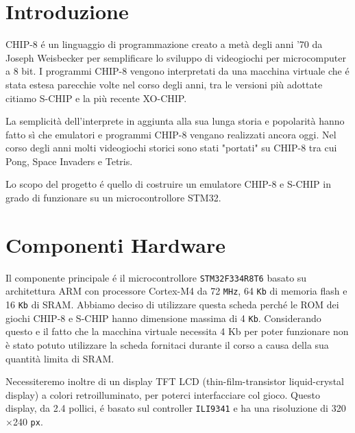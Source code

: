 \documentclass[a4paper]{article}
\begin{document}
\setlength{\parindent}{0pt}
\setlength{\parskip}{0.8em}
\linespread{1.5}

\section{Introduzione}

CHIP-8 é un linguaggio di programmazione creato a metà degli anni '70 da Joseph Weisbecker per semplificare lo sviluppo di videogiochi per microcomputer a 8 bit. I programmi CHIP-8 vengono interpretati da una macchina virtuale che é stata estesa parecchie volte nel corso degli anni, tra le versioni più adottate citiamo S-CHIP e la più recente XO-CHIP.

La semplicità dell'interprete in aggiunta alla sua lunga storia e popolarità hanno fatto sì che emulatori e programmi CHIP-8 vengano realizzati ancora oggi. Nel corso degli anni molti videogiochi storici sono stati "portati" su CHIP-8 tra cui Pong, Space Invaders e Tetris.

Lo scopo del progetto é quello di costruire un emulatore CHIP-8 e S-CHIP in grado di funzionare su un microcontrollore STM32.

\section{Componenti Hardware}



Il componente principale é il microcontrollore \texttt{STM32F334R8T6} basato su architettura ARM con processore Cortex-M4 da 72 \texttt{MHz}, 64 \texttt{Kb} di memoria flash e 16 \texttt{Kb} di SRAM. Abbiamo deciso di utilizzare questa scheda perché le ROM dei giochi CHIP-8 e S-CHIP hanno dimensione massima di 4 \texttt{Kb}. Considerando questo e il fatto che la macchina virtuale necessita 4 Kb per poter funzionare non è stato potuto utilizzare la scheda fornitaci durante il corso a causa della sua quantità limita di SRAM.

Necessiteremo inoltre di un display TFT LCD (thin-film-transistor liquid-crystal display) a colori retroilluminato, per poterci interfacciare col gioco. Questo display, da 2.4 pollici, é basato sul controller \texttt{ILI9341} e ha una risoluzione di 320$\times$240 \texttt{px}.
\end{document}
